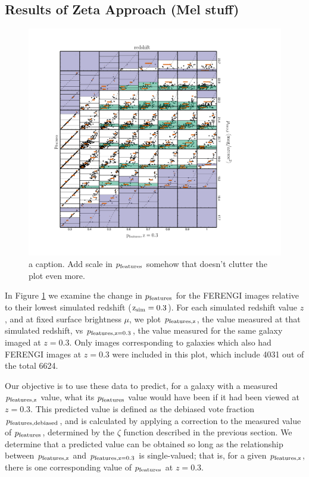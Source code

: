 \documentclass[usenatbib]{mn2e}
\begin{document}
\subsection{Results of Zeta Approach (Mel stuff)}

\begin{figure}
\begin{center}
\includegraphics[width=\textwidth]{p_vs_p_SB_redshift.pdf}
\caption{a caption. Add scale in $p_{\rm features}$ somehow that doesn't clutter the plot even more. }
\label{fig:p_vs_p}
\end{center}
\end{figure}

In Figure \ref{fig:p_vs_p} we examine the change in $p_{\rm features}$ for the FERENGI images relative to their lowest simulated redshift ($\rm z_{sim}=0.3$). For each simulated redshift value $z$, and at fixed surface brightness $\mu$, we plot $p_{\rm features,z}$, the value measured at that simulated redshift, vs $p_{\rm features,z=0.3}$, the value measured for the same galaxy imaged at $z=0.3$. Only images corresponding to galaxies which also had FERENGI images at $z=0.3$ were included in this plot, which include 4031 out of the total 6624.
 
Our objective is to use these data to predict, for a galaxy with a measured $p_{\rm features,z}$ value, what its $p_{\rm features}$ value would have been if it had been viewed at $z=0.3$. This predicted value is defined as the debiased vote fraction $p_{\rm features,debiased}$, and is calculated by applying a correction to the measured value of $p_{\rm features}$, determined by the $\zeta$ function described in the previous section. We determine that a predicted value can be obtained so long as the relationship between $p_{\rm features,z}$ and $p_{\rm features,z=0.3}$ is single-valued; that is, for a given $p_{\rm features,z}$, there is one corresponding value of $p_{\rm features}$ at $z=0.3$. 
\end{document}

